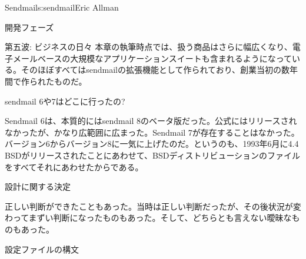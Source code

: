 \begin{aosachapter}{Sendmail}{s:sendmail}{Eric Allman}
\begin{aosasect1}{開発フェーズ}
\begin{aosasect2}{第五波: ビジネスの日々}
本章の執筆時点では、扱う商品はさらに幅広くなり、電子メールベースの大規模なアプリケーションスイートも含まれるようになっている。そのほぼすべてはsendmailの拡張機能として作られており、創業当初の数年間で作られたものだ。

\end{aosasect2}

\begin{aosasect2}{sendmail 6や7はどこに行ったの?}

Sendmail 6は、本質的にはsendmail 8のベータ版だった。公式にはリリースされなかったが、かなり広範囲に広まった。Sendmail 7が存在することはなかった。バージョン6からバージョン8に一気に上げたのだ。というのも、1993年6月に4.4 BSDがリリースされたことにあわせて、BSDディストリビューションのファイルをすべてそれにあわせたからである。

\end{aosasect2}

\end{aosasect1}

\begin{aosasect1}{設計に関する決定}

正しい判断ができたこともあった。当時は正しい判断だったが、その後状況が変わってまずい判断になったものもあった。そして、どちらとも言えない曖昧なものもあった。

\begin{aosasect2}{設定ファイルの構文}


\end{aosasect2}
\end{aosasect1}
\end{aosachapter}

